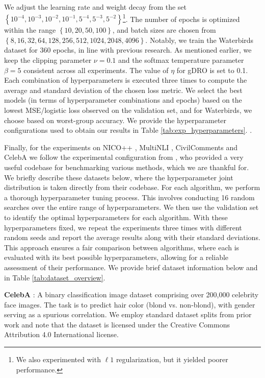 We adjust the learning rate and weight decay from the set $\left\{10^{-4}, 10^{-3}, 10^{-2}, 10^{-1}, 5^{-4}, 5^{-3}, 5^{-2}\right\}$\footnote{We also experimented with $\ell1$ regularization, but it yielded poorer performance.}. The number of epochs is optimized within the range $\left\{10, 20, 50, 100\right\}$, and batch sizes are chosen from $\left\{8, 16, 32, 64, 128, 256, 512, 1024, 2048, 4096\right\}$. Notably, we train the Waterbirds dataset for 360 epochs, in line with previous research. As mentioned earlier, we keep the clipping parameter $\nu=0.1$ and the softmax temperature parameter $\beta=5$ consistent across all experiments. The value of $\eta$ for gDRO is set to 0.1. Each combination of hyperparameters is executed three times to compute the average and standard deviation of the chosen loss metric. We select the best models (in terms of hyperparameter combinations and epochs) based on the lowest MSE/logistic loss observed on the validation set, and for Waterbirds, we choose based on worst-group accuracy. We provide the hyperparameter configurations used to obtain our results in Table \ref{tab:exp_hyperparameters}. .

Finally, for the experiments on NICO++ \citep{zhang2023nico}, MultiNLI \citep{williams2017broad}, CivilComments \citep{borkan2019nuanced} and CelebA \citep{liang2022metashift} we follow the experimental configuration from \citet{yang2023change}, who provided a very useful codebase for benchmarking various methods, which we are thankful for. We briefly describe these datasets below, where the hyperparameter joint distribution is taken directly from their codebase. For each algorithm, we perform a thorough hyperparameter tuning process. This involves conducting 16 random searches over the entire range of hyperparameters. We then use the validation set to identify the optimal hyperparameters for each algorithm. With these hyperparameters fixed, we repeat the experiments three times with different random seeds and report the average results along with their standard deviations. This approach ensures a fair comparison between algorithms, where each is evaluated with its best possible hyperparameters, allowing for a reliable assessment of their performance. We provide brief dataset information below and in Table \ref{tab:dataset_overview}.

\textbf{CelebA} \citep{liang2022metashift}: A binary classification image dataset comprising over 200,000 celebrity face images. The task is to predict hair color (blond vs. non-blond), with gender serving as a spurious correlation. We employ standard dataset splits from prior work \citep{idrissi2022simple} and note that the dataset is licensed under the Creative Commons Attribution 4.0 International license. \\

